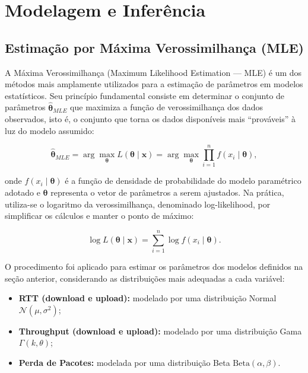 \documentclass{article}
\begin{document}
\section{Modelagem e Inferência}

\subsection{Estimação por Máxima Verossimilhança (MLE)}

A Máxima Verossimilhança (Maximum Likelihood Estimation — MLE) é um dos métodos
mais amplamente utilizados para a estimação de parâmetros em modelos estatísticos.
Seu princípio fundamental consiste em determinar o conjunto de parâmetros
$\hat{\boldsymbol{\theta}}_{MLE}$ que maximiza a função de verossimilhança dos dados observados,
isto é, o conjunto que torna os dados disponíveis mais “prováveis” à luz do modelo assumido:

\begin{equation}
	\hat{\boldsymbol{\theta}}_{MLE} = \arg\max_{\boldsymbol{\theta}} 
	L(\boldsymbol{\theta} \mid \mathbf{x}) = 
	\arg\max_{\boldsymbol{\theta}} 
	\prod_{i=1}^{n} f(x_i \mid \boldsymbol{\theta}),
\end{equation}

onde $f(x_i \mid \boldsymbol{\theta})$ é a função de densidade de probabilidade do modelo paramétrico adotado
e $\boldsymbol{\theta}$ representa o vetor de parâmetros a serem ajustados.
Na prática, utiliza-se o logaritmo da verossimilhança, denominado log-likelihood,
por simplificar os cálculos e manter o ponto de máximo:

\begin{equation}
	\log L(\boldsymbol{\theta} \mid \mathbf{x}) =
	\sum_{i=1}^{n} \log f(x_i \mid \boldsymbol{\theta}).
\end{equation}

O procedimento foi aplicado para estimar os parâmetros dos modelos definidos na seção anterior,
considerando as distribuições mais adequadas a cada variável:
\begin{itemize}
	\item \textbf{RTT (download e upload):} modelado por uma distribuição Normal $\mathcal{N}(\mu, \sigma^2)$;
	\item \textbf{Throughput (download e upload):} modelado por uma distribuição Gama $\Gamma(k, \theta)$;
	\item \textbf{Perda de Pacotes:} modelada por uma distribuição Beta $\mathrm{Beta}(\alpha, \beta)$.
\end{itemize}
\end{document}
